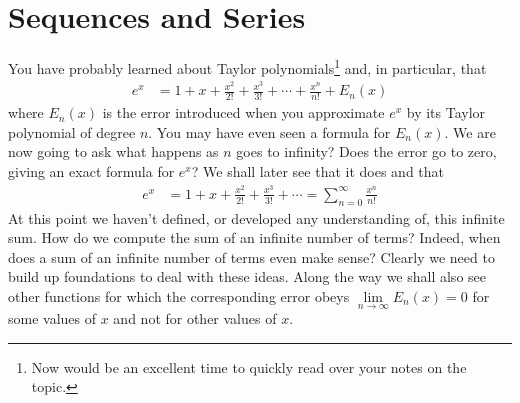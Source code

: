 %
%
\graphicspath{{figures/series/}}
\chapter{Sequences and Series}\label{chap seq ser}

You have probably learned about Taylor polynomials\footnote{Now would be an
excellent time to quickly read over your notes on the topic.} and, in particular, that
\begin{align*}
e^x &= 1 + x  + \frac{x^2}{2!} + \frac{x^3}{3!} + \cdots + \frac{x^n}{n!}
      +E_n(x)
\end{align*}
where $E_n(x)$ is the error introduced when you approximate $e^x$ by
its Taylor polynomial of degree $n$. You may have even seen a formula for $E_n(x)$. We are now going to ask what happens as $n$
goes to infinity? Does the error go to zero, giving an exact formula for $e^x$? We shall later see that it does and
that
\begin{align*}
e^x &=1 + x  + \frac{x^2}{2!} + \frac{x^3}{3!} + \cdots = \sum_{n=0}^\infty\frac{x^n}{n!}
\end{align*}
At this point we haven't defined, or developed any understanding of,
this infinite sum. How do we compute the sum of an infinite number of
terms? Indeed, when does a sum of an infinite
number of terms even make sense? Clearly we need to build up
foundations to deal with these ideas. Along the way we
shall also see other functions for which the corresponding error
obeys $\lim\limits_{n\rightarrow\infty}E_n(x)=0$ for
some values of $x$ and not for other values of $x$.

